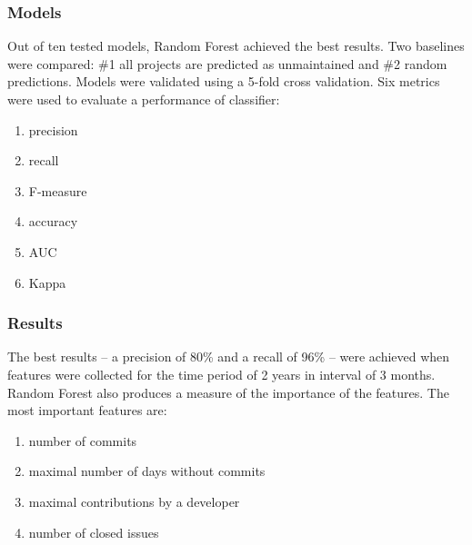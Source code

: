 \subsubsection{Models}

Out of ten tested models, Random Forest achieved the best results.
Two baselines were compared: \#1 all projects are predicted as unmaintained and \#2 random predictions.
Models were validated using a 5-fold cross validation.
Six metrics were used to evaluate a performance of classifier:

\begin{enumerate}
    \item precision
    \item recall
    \item F-measure
    \item accuracy
    \item AUC
    \item Kappa
\end{enumerate}

\subsubsection{Results}

The best results -- a precision of 80\% and a recall of 96\% -- were achieved when features were collected for the time period of 2 years in interval of 3 months.
Random Forest also produces a measure of the importance of the features.
The most important features are:

\begin{enumerate}
    \item number of commits
    \item maximal number of days without commits 
    \item maximal contributions by a developer
    \item number of closed issues
\end{enumerate}
